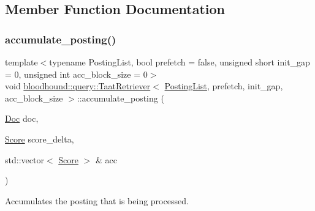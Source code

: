 \subsection{Member Function Documentation}
\mbox{\label{classbloodhound_1_1query_1_1TaatRetriever_a34def8d627b446d7459792ab9c50dcab}} 
\subsubsection{\texorpdfstring{accumulate\+\_\+posting()}{accumulate\_posting()}}
{\footnotesize\ttfamily template$<$typename Posting\+List, bool prefetch = false, unsigned short init\+\_\+gap = 0, unsigned int acc\+\_\+block\+\_\+size = 0$>$ \\
void \mbox{\hyperlink{classbloodhound_1_1query_1_1TaatRetriever}{bloodhound\+::query\+::\+Taat\+Retriever}}$<$ \mbox{\hyperlink{classbloodhound_1_1PostingList}{Posting\+List}}, prefetch, init\+\_\+gap, acc\+\_\+block\+\_\+size $>$\+::accumulate\+\_\+posting (\begin{DoxyParamCaption}\item[{\mbox{\hyperlink{structbloodhound_1_1Doc}{Doc}}}]{doc,  }\item[{\mbox{\hyperlink{structbloodhound_1_1Score}{Score}}}]{score\+\_\+delta,  }\item[{std\+::vector$<$ \mbox{\hyperlink{structbloodhound_1_1Score}{Score}} $>$ \&}]{acc }\end{DoxyParamCaption})\hspace{0.3cm}{\ttfamily [inline]}}



Accumulates the posting that is being processed. 

\mbox{\label{classbloodhound_1_1query_1_1TaatRetriever_a7f631f87075249c768873d15a59956c5}} 
